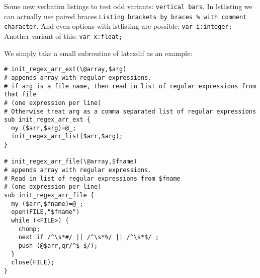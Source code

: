 \documentclass{article}
\begin{document}
Some new verbatim listings to test odd variants: \verb|vertical bars|.
In lstlisting we can actually use paired braces \lstinline{Listing brackets by braces % with comment character}.
And even options with lstlisting are possible: \lstinline[basicstyle=\footnotesize]{var i:integer;} 
Another variant of this: \lstinline[basicstyle=\footnotesize]$var x:float;$ 

We simply take a small subroutine of latexdif as an example:
\lstset{language=perl}
\begin{lstlisting}[commentstyle=\color{gray}]
# init_regex_arr_ext(\@array,$arg)
# appends array with regular expressions.
# if arg is a file name, then read in list of regular expressions from that file
# (one expression per line)
# Otherwise treat arg as a comma separated list of regular expressions
sub init_regex_arr_ext {
  my ($arr,$arg)=@_;
  init_regex_arr_list($arr,$arg);
}

# init_regex_arr_file(\@array,$fname)
# appends array with regular expressions.
# Read in list of regular expressions from $fname
# (one expression per line)
sub init_regex_arr_file {
  my ($arr,$fname)=@_;
  open(FILE,"$fname")
  while (<FILE>) {
    chomp;
    next if /^\s*#/ || /^\s*%/ || /^\s*$/ ;
    push (@$arr,qr/^$_$/);
  }
  close(FILE);
}
\end{lstlisting}
\end{document}
